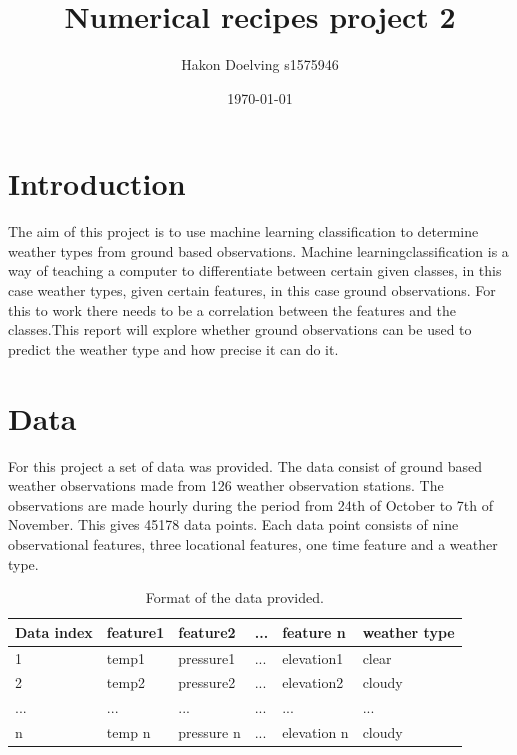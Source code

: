 \documentclass[12pt]{article}
\title{Numerical recipes project 2}
\author{Hakon Doelving s1575946}
\date{\today}
\begin{document}
\maketitle



\section{Introduction}
\label{sec:introduction}

The aim of this project is to use machine learning classification to determine weather types from ground based observations. Machine learning\newline classification is a way of teaching a computer to differentiate between certain given classes, in this case weather types, given certain features, in this case ground observations. For this to work there needs to be a correlation between the features and the classes.\newline This report will explore whether ground observations can be used to predict the weather type and how precise it can do it.

\section{Data}
\label{sec:data}
For this project a set of data was provided. The data consist of ground based weather observations made from 126 weather observation stations. The observations are made hourly during the period from 24th of October to 7th of November. This gives 45178 data points. Each data point consists of nine observational features, three locational features, one time feature and a weather type.
\begin{table}
\begin{center}
\begin{tabular}{| l | l | l | l | l | l |}
\hline
Data index & feature1 & feature2 & ... & feature n & weather type \\\hline
1 & temp1 & pressure1 & ... & elevation1 & clear \\
2 & temp2 & pressure2 & ... & elevation2 & cloudy \\
... & ... & ... & ... & ... & ... \\
n & temp n & pressure n & ... & elevation n & cloudy \\
\hline
\end{tabular}
\caption{\label{tab:widgets}Format of the data provided.}
\end{center}
\end{table}
\end{document}
